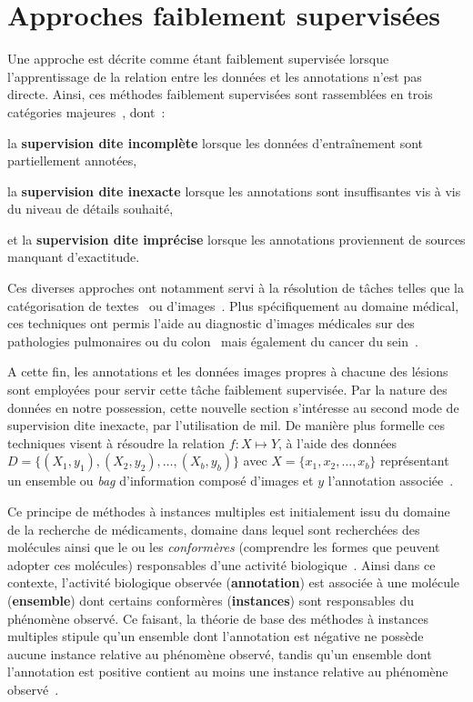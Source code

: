 \section{Approches faiblement supervisées}
\label{sec:patient_decision_weak}
Une approche est décrite comme étant faiblement supervisée lorsque l'apprentissage de la relation entre les données et les annotations n'est pas directe. Ainsi, ces méthodes faiblement supervisées sont rassemblées en trois catégories majeures~\cite{Zhou2018}, dont~:
\begin{inlinerate}
    \item la \textbf{supervision dite incomplète} lorsque les données d'entraînement sont partiellement annotées,
    \item la \textbf{supervision dite inexacte} lorsque les annotations sont insuffisantes vis à vis du niveau de détails souhaité,
    \item et la \textbf{supervision dite imprécise} lorsque les annotations proviennent de sources manquant d'exactitude.
\end{inlinerate} Ces diverses approches ont notamment servi à la résolution de tâches telles que la catégorisation de textes~\cite{Andrews2003,Settles2008} ou d'images~\cite{Chen2004,Tang2009}. Plus spécifiquement au domaine médical, ces techniques ont permis l'aide au diagnostic d'images médicales sur des pathologies pulmonaires ou du colon~\cite{Dundar2007} mais également du cancer du sein~\cite{Sudharshan2019}.\par

A cette fin, les annotations et les données images propres à chacune des lésions sont employées pour servir cette tâche faiblement supervisée. Par la nature des données en notre possession, cette nouvelle section s'intéresse au second mode de supervision dite inexacte, par l'utilisation de \gls{mil}. De manière plus formelle ces techniques visent à résoudre la relation $f: X \mapsto Y$, à l'aide des données $D=\{(X_1,y_1),(X_2,y_2),\ldots,(X_b,y_b)\}$ avec $X=\{x_1,x_2,\ldots,x_b\}$ représentant un ensemble ou \textit{bag} d'information composé d'images et $y$ l'annotation associée~\cite{foulds2010}.\par

Ce principe de méthodes à instances multiples est initialement issu du domaine de la recherche de médicaments, domaine dans lequel sont recherchées des molécules ainsi que le ou les \textit{conformères} (comprendre les formes que peuvent adopter ces molécules) responsables d'une activité biologique~\cite{Dietterich1997}. Ainsi dans ce contexte, l'activité biologique observée (\textbf{annotation}) est associée à une molécule (\textbf{ensemble}) dont certains conformères (\textbf{instances}) sont responsables du phénomène observé. Ce faisant, la théorie de base des méthodes à instances multiples stipule qu'un ensemble dont l'annotation est négative ne possède aucune instance relative au phénomène observé, tandis qu'un ensemble dont l'annotation est positive contient au moins une instance relative au phénomène observé~\cite{Dietterich1997}.\par

